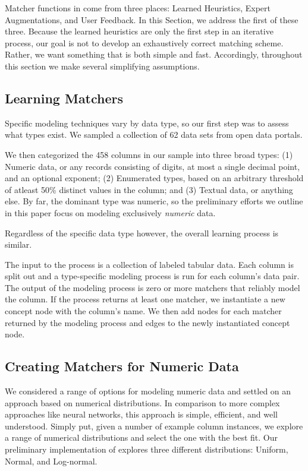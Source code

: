 
Matcher functions in \systemname come from three places: Learned Heuristics, Expert Augmentations, and User Feedback. 
In this Section, we address the first of these three.
Because the learned heuristics are only the first step in an iterative process, our goal is not to develop an exhaustively correct matching scheme.
Rather, we want something that is both simple and fast.
Accordingly, throughout this section we make several simplifying assumptions.




\subsection{Learning Matchers}
Specific modeling techniques vary by data type, so our first step was to assess what types exist.
We sampled a collection of 62 data sets from open data portals. 

We then categorized the 458 columns in our sample into three broad types: 
(1) Numeric data, or any records consisting of digits, at most a single decimal point, and an optional exponent; 
(2) Enumerated types, based on an arbitrary threshold of atleast 50\% distinct values in the column; and 
(3) Textual data, or anything else.  
By far, the dominant type was numeric, so the preliminary efforts we outline in this paper focus on modeling exclusively \emph{numeric} data.

Regardless of the specific data type however, the overall learning process is similar.

The input to the process is a collection of labeled tabular data.  
Each column is split out and a type-specific modeling process is run for each column's data pair.
The output of the modeling process is zero or more matchers that reliably model the column.
If the process returns at least one matcher, we instantiate a new concept node with the column's name.
We then add nodes for each matcher returned by the modeling process and edges to the newly instantiated concept node.

\subsection{Creating Matchers for Numeric Data}
We considered a range of options for modeling numeric data and settled on an approach based on numerical distributions.
In comparison to more complex approaches like neural networks, this approach is simple, efficient, and well understood.
Simply put, given a number of example column instances, we explore a range of numerical distributions and select the one with the best fit.
Our preliminary implementation of \systemname explores three different distributions: Uniform, Normal, and Log-normal. 

